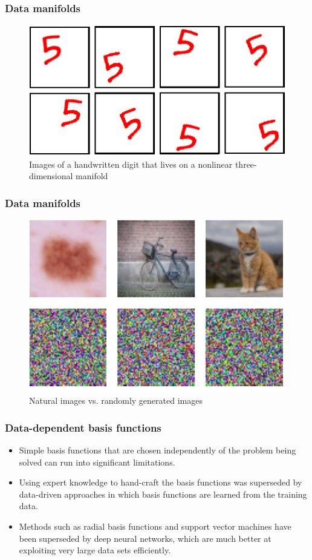 \documentclass{beamer}
\begin{document}
\begin{frame}
    \frametitle{Data manifolds}
    \begin{figure}
        \caption{Images of a handwritten digit that lives on a nonlinear three-dimensional manifold}
        \includegraphics{Figure_7.pdf}
    \end{figure}
\end{frame}

\begin{frame}
    \frametitle{Data manifolds}
    \begin{figure}
        \caption{Natural images vs. randomly generated images}
        \includegraphics[height=0.7\textheight]{Figure_8.pdf}
    \end{figure}
\end{frame}

\begin{frame}
    \frametitle{Data-dependent basis functions}
    \begin{itemize}
        \item Simple basis functions that are chosen independently of the problem being solved can run into significant limitations.
        \item Using expert knowledge to hand-craft the basis functions was superseded by data-driven approaches in which basis functions are learned from the training data.
        \item Methods such as radial basis functions and support vector machines have been superseded by deep neural networks, which are much better at exploiting very large data sets efficiently.
    \end{itemize}
\end{frame}
\end{document}
